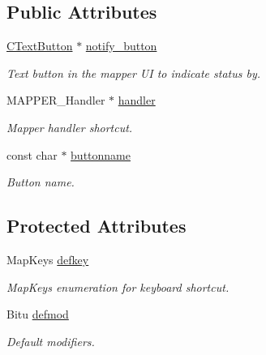 \subsection*{Public Attributes}
\begin{DoxyCompactItemize}
\item 
\hypertarget{classCHandlerEvent_ac636235e80032332d688fe888ebd5cf4}{\hyperlink{classCTextButton}{C\-Text\-Button} $\ast$ \hyperlink{classCHandlerEvent_ac636235e80032332d688fe888ebd5cf4}{notify\-\_\-button}}\label{classCHandlerEvent_ac636235e80032332d688fe888ebd5cf4}

\begin{DoxyCompactList}\small\item\em Text button in the mapper U\-I to indicate status by. \end{DoxyCompactList}\item 
\hypertarget{classCHandlerEvent_a9227a65125fadc33d775cc0de3b29393}{M\-A\-P\-P\-E\-R\-\_\-\-Handler $\ast$ \hyperlink{classCHandlerEvent_a9227a65125fadc33d775cc0de3b29393}{handler}}\label{classCHandlerEvent_a9227a65125fadc33d775cc0de3b29393}

\begin{DoxyCompactList}\small\item\em Mapper handler shortcut. \end{DoxyCompactList}\item 
\hypertarget{classCHandlerEvent_a935a8c622ac72d46512f5c88fefacda8}{const char $\ast$ \hyperlink{classCHandlerEvent_a935a8c622ac72d46512f5c88fefacda8}{buttonname}}\label{classCHandlerEvent_a935a8c622ac72d46512f5c88fefacda8}

\begin{DoxyCompactList}\small\item\em Button name. \end{DoxyCompactList}\end{DoxyCompactItemize}
\subsection*{Protected Attributes}
\begin{DoxyCompactItemize}
\item 
\hypertarget{classCHandlerEvent_a7d53624253497b7dcad4a281a790333d}{Map\-Keys \hyperlink{classCHandlerEvent_a7d53624253497b7dcad4a281a790333d}{defkey}}\label{classCHandlerEvent_a7d53624253497b7dcad4a281a790333d}

\begin{DoxyCompactList}\small\item\em Map\-Keys enumeration for keyboard shortcut. \end{DoxyCompactList}\item 
\hypertarget{classCHandlerEvent_a2ebc8142a6ef34d7c23349e86a0d4486}{Bitu \hyperlink{classCHandlerEvent_a2ebc8142a6ef34d7c23349e86a0d4486}{defmod}}\label{classCHandlerEvent_a2ebc8142a6ef34d7c23349e86a0d4486}

\begin{DoxyCompactList}\small\item\em Default modifiers. \end{DoxyCompactList}\end{DoxyCompactItemize}


